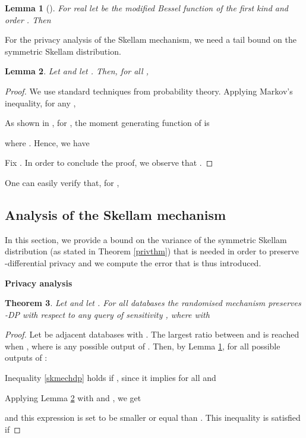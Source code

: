 \documentclass[10pt]{extarticle}
\newtheorem{Thm}{Theorem}
\newtheorem{Lem}[Thm]{Lemma}
\begin{document}
\begin{Lem}[\cite{27}]\label{modbesrat} For real  let  be the modified Bessel function of the first kind and order . Then
 
\end{Lem}

For the privacy analysis of the Skellam mechanism, we need a tail bound on the symmetric Skellam distribution.

\begin{Lem}\label{SKELLAMBOUND} Let  and let . Then, for all , 

\end{Lem}
\begin{proof}
We use standard techniques from probability theory. Applying Markov's inequality, for any ,

As shown in \cite{30}, for , the moment generating function of  is 

where . Hence, we have

Fix . In order to conclude the proof, we observe that .
\end{proof}

\noindent One can easily verify that, for ,


\subsection{Analysis of the Skellam mechanism}

In this section, we provide a bound on the variance  of the symmetric Skellam distribution (as stated in Theorem \ref{privthm}) that is needed in order to preserve -differential privacy and we compute the error that is thus introduced.\par\bigskip\bigskip

\noindent\textbf{Privacy analysis}



\begin{Thm}\label{skmech} Let  and let . For all databases  the randomised mechanism 
preserves -\mbox{\upshape\sffamily DP} with respect to any query  of sensitivity , where  with 

\end{Thm}
\begin{proof} Let  be adjacent databases with . The largest ratio between  and  is reached when , where  is any possible output of .
Then, by Lemma \ref{modbesrat}, for all possible outputs  of :

Inequality \eqref{skmechdp} holds if , since it implies  for all  and
 
Applying Lemma \ref{SKELLAMBOUND} with  and , we get

and this expression is set to be smaller or equal than . This inequality is satisfied if

\end{proof}
\end{document}
